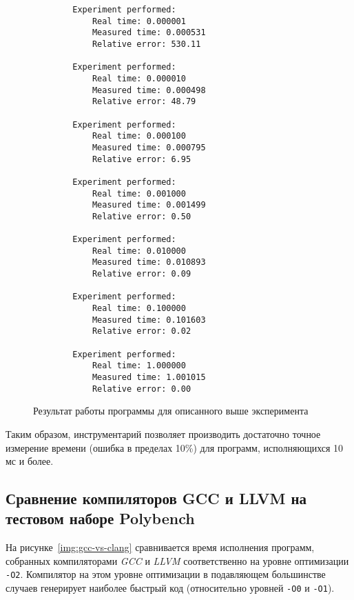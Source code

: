 \begin{figure}[tbp]
    \fontsize{12}{15}
    \begin{verbatim}
        Experiment performed:
            Real time: 0.000001
            Measured time: 0.000531
            Relative error: 530.11
        
        Experiment performed:
            Real time: 0.000010
            Measured time: 0.000498
            Relative error: 48.79
        
        Experiment performed:
            Real time: 0.000100
            Measured time: 0.000795
            Relative error: 6.95
        
        Experiment performed:
            Real time: 0.001000
            Measured time: 0.001499
            Relative error: 0.50
        
        Experiment performed:
            Real time: 0.010000
            Measured time: 0.010893
            Relative error: 0.09
        
        Experiment performed:
            Real time: 0.100000
            Measured time: 0.101603
            Relative error: 0.02
        
        Experiment performed:
            Real time: 1.000000
            Measured time: 1.001015
            Relative error: 0.00
    \end{verbatim}
    \caption{Результат работы программы для описанного выше эксперимента}
    \label{img:default_calibration}
\end{figure}

Таким образом, инструментарий позволяет производить достаточно точное измерение времени (ошибка в пределах 10\%) для программ, исполняющихся 10 мс и более.


\subsection{Сравнение компиляторов GCC и LLVM на тестовом наборе Polybench}
\label{series-llvm-vs-gcc}
На рисунке~\ref{img:gcc-vs-clang} сравнивается время исполнения программ, собранных компиляторами \textit{GCC} и \textit{LLVM} соответственно на уровне оптимизации \texttt{-O2}. Компилятор на этом уровне оптимизации в подавляющем большинстве случаев генерирует наиболее быстрый код (относительно уровней \texttt{-O0} и \texttt{-O1}).

\begin{figure}
\end{figure}

